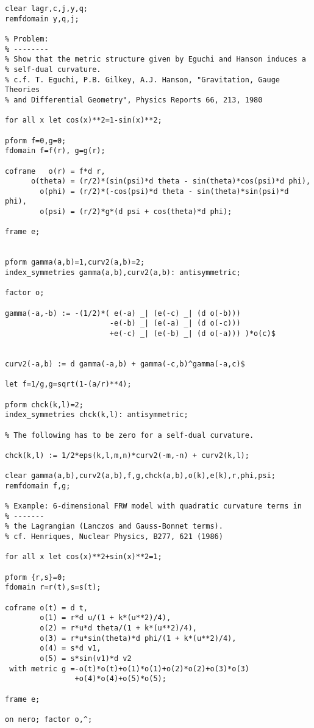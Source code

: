{\begin{verbatim}
clear lagr,c,j,y,q;
remfdomain y,q,j;

% Problem:
% --------
% Show that the metric structure given by Eguchi and Hanson induces a
% self-dual curvature.
% c.f. T. Eguchi, P.B. Gilkey, A.J. Hanson, "Gravitation, Gauge Theories
% and Differential Geometry", Physics Reports 66, 213, 1980

for all x let cos(x)**2=1-sin(x)**2;

pform f=0,g=0;
fdomain f=f(r), g=g(r);

coframe   o(r) = f*d r,
      o(theta) = (r/2)*(sin(psi)*d theta - sin(theta)*cos(psi)*d phi),
        o(phi) = (r/2)*(-cos(psi)*d theta - sin(theta)*sin(psi)*d phi),
        o(psi) = (r/2)*g*(d psi + cos(theta)*d phi);

frame e;


pform gamma(a,b)=1,curv2(a,b)=2;
index_symmetries gamma(a,b),curv2(a,b): antisymmetric;

factor o;

gamma(-a,-b) := -(1/2)*( e(-a) _| (e(-c) _| (d o(-b)))
                        -e(-b) _| (e(-a) _| (d o(-c)))
                        +e(-c) _| (e(-b) _| (d o(-a))) )*o(c)$


curv2(-a,b) := d gamma(-a,b) + gamma(-c,b)^gamma(-a,c)$

let f=1/g,g=sqrt(1-(a/r)**4);

pform chck(k,l)=2;
index_symmetries chck(k,l): antisymmetric;

% The following has to be zero for a self-dual curvature.

chck(k,l) := 1/2*eps(k,l,m,n)*curv2(-m,-n) + curv2(k,l);

clear gamma(a,b),curv2(a,b),f,g,chck(a,b),o(k),e(k),r,phi,psi;
remfdomain f,g;

% Example: 6-dimensional FRW model with quadratic curvature terms in
% -------
% the Lagrangian (Lanczos and Gauss-Bonnet terms).
% cf. Henriques, Nuclear Physics, B277, 621 (1986)

for all x let cos(x)**2+sin(x)**2=1;

pform {r,s}=0;
fdomain r=r(t),s=s(t);

coframe o(t) = d t,
        o(1) = r*d u/(1 + k*(u**2)/4),
        o(2) = r*u*d theta/(1 + k*(u**2)/4),
        o(3) = r*u*sin(theta)*d phi/(1 + k*(u**2)/4),
        o(4) = s*d v1,
        o(5) = s*sin(v1)*d v2
 with metric g =-o(t)*o(t)+o(1)*o(1)+o(2)*o(2)+o(3)*o(3)
                +o(4)*o(4)+o(5)*o(5);

frame e;

on nero; factor o,^;


\end{verbatim}}
